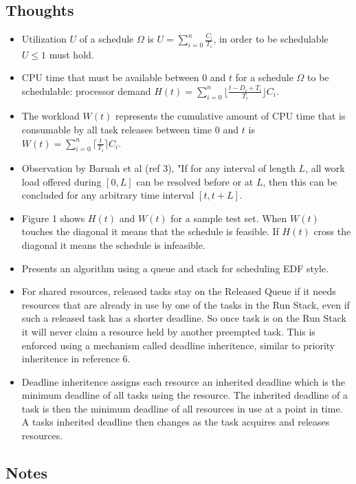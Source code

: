 \documentclass{article}
\begin{document}
\subsection{Thoughts}
\begin{itemize}
	\item Utilization $U$ of a schedule $\Omega$ is $U=\sum_{i=0}^n \frac{C_i}{T_i}$, in order to be schedulable $U \leq 1$ must hold.
	\item CPU time that must be available between 0 and $t$ for a schedule $\Omega$ to be schedulable: processor demand $H(t)=\sum_{i=0}^n \lfloor \frac{t - D_i + T_i}{T_i} \rfloor C_i$.
	\item The workload $W(t)$ represents the cumulative amount of CPU time that is consumable by all task releases between time 0 and $t$ is $W(t)=\sum_{i=0}^n \lceil \frac{t}{T_i} \rceil C_i$.
	\item Observation by Baruah et al (ref 3), "If for any interval of length $L$, all work load offered during $[0,L]$ can be resolved before or at $L$, then this can be concluded for any arbitrary time interval $[t, t+L]$.
	\item Figure 1 shows $H(t)$ and $W(t)$ for a sample test set.  When $W(t)$ touches the diagonal it means that the schedule is feasible.  If $H(t)$ cross the diagonal it means the schedule is infeasible.
	\item Presents an algorithm using a queue and stack for scheduling EDF style.
	\item For shared resources, released tasks stay on the Released Queue if it needs resources that are already in use by one of the tasks in the Run Stack, even if such a released task has a shorter deadline.  So once  task is on the Run Stack it will never claim a resource held by another preempted task.  This is enforced using a mechanism called deadline inheritence, similar to priority inheritence in reference 6.
	\item Deadline inheritence assigns each resource an inherited deadline which is the minimum deadline of all tasks using the resource.  The inherited deadline of a task is then the minimum deadline of all resources in use at a point in time.  A tasks inherited deadline then changes as the task acquires and releases resources.
\end{itemize}

\subsection{Notes}
\end{document}
